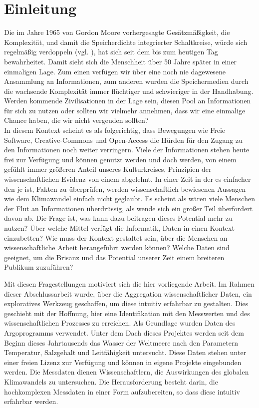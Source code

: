 
\section{Einleitung}

    
    Die im Jahre 1965 von Gordon Moore vorhergesagte Gesätzmäßigkeit, die Komplexität, und damit die Speicherdichte integrierter Schaltkreise, würde sich regelmäßig verdoppeln (vgl. \cite{moore1998cramming}),  hat sich seit dem bis zum heutigen Tag bewahrheitet. Damit sieht sich die Menschheit über 50 Jahre später in einer einmaligen Lage. 
    Zum einen verfügen wir über eine noch nie dagewesene Ansammlung an Informationen, zum anderen wurden die Speichermedien durch die wachsende Komplexität immer flüchtiger und schwieriger in der Handhabung. Werden kommende Zivilisationen in der Lage sein, diesen Pool an Informationen für sich zu nutzen oder sollten wir vielmehr annehmen, dass wir eine einmalige Chance haben, die wir nicht vergeuden sollten? \\
    
    In diesem Kontext scheint es als folgerichtig, dass Bewegungen wie Freie Software, Creative-Commons und Open-Access die Hürden für den Zugang zu den Informationen noch weiter verringern.  Viele der Informationen stehen heute frei zur Verfügung und können genutzt werden und doch werden, von einem gefühlt immer größeren Anteil unseres Kulturkreises, Prinzipien der wissenschaftlichen Evidenz von einem abgelehnt. 
    In einer Zeit in der es einfacher den je ist, Fakten zu überprüfen, werden wissenschaftlich bewiesenen Aussagen wie dem Klimawandel einfach nicht geglaubt.
    Es scheint als wären viele Menschen der Flut an Informationen überdrüssig, als wende sich ein großer Teil überfordert davon ab.
    Die Frage ist, was kann dazu beitragen dieses Potential mehr zu nutzen? 
    Über welche Mittel verfügt die Informatik, Daten in einen Kontext einzubetten? Wie muss der Kontext gestaltet sein, über die Menschen an  wissenschaftliche Arbeit herangeführt werden können? Welche Daten sind geeignet, um die Brisanz und das Potential unserer Zeit einem breiteren Publikum zuzuführen? 
    
    Mit diesen Fragestellungen motiviert sich die hier vorliegende Arbeit. Im Rahmen dieser Abschlussarbeit wurde, über die Aggregation wissenschaftlicher Daten, ein exploratives Werkzeug geschaffen, um diese intuitiv erfahrbar zu gestalten. Dies geschieht mit der Hoffnung, hier eine Identifikation mit den Messwerten und des wissenschaftlichen Prozesses zu erreichen. Als Grundlage wurden Daten des Argoprogramms verwendet. Unter dem Dach dieses Projektes werden seit dem Beginn dieses Jahrtausends das Wasser der Weltmeere nach den Parametern Temperatur, Salzgehalt und Leitfähigkeit untersucht. Diese Daten stehen unter einer freien Lizenz zur Verfügung und können in eigene Projekte eingebunden werden.  Die Messdaten dienen Wissenschaftlern, die Auswirkungen des globalen Klimawandels zu untersuchen. Die Herausforderung besteht darin, die  hochkomplexen Messdaten in einer Form aufzubereiten, so dass diese intuitiv erfahrbar werden.\\
    
